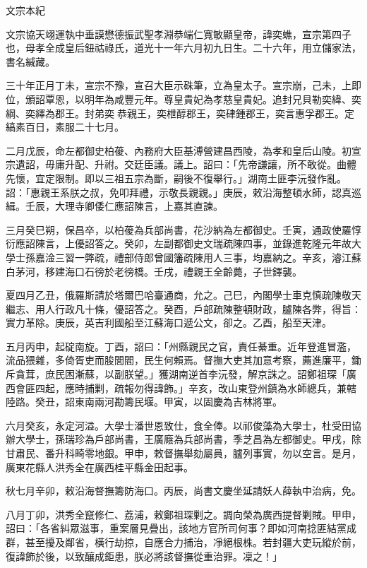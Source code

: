 
\begin{pinyinscope}
文宗本紀

文宗協天翊運執中垂謨懋德振武聖孝淵恭端仁寬敏顯皇帝，諱奕蟭，宣宗第四子也，母孝全成皇后鈕祜祿氏，道光十一年六月初九日生。二十六年，用立儲家法，書名緘藏。

三十年正月丁未，宣宗不豫，宣召大臣示硃筆，立為皇太子。宣宗崩，己未，上即位，頒詔覃恩，以明年為咸豐元年。尊皇貴妃為孝慈皇貴妃。追封兄貝勒奕緯、奕綱、奕繹為郡王。封弟奕恭親王，奕枻醇郡王，奕硉鍾郡王，奕言惠孚郡王。定縞素百日，素服二十七月。

二月戊辰，命左都御史柏葰、內務府大臣基溥營建昌西陵，為孝和皇后山陵。初宣宗遺詔，毋庸升配、升祔。交廷臣議。議上。詔曰：「先帝謙讓，所不敢從。曲體先懷，宜定限制。即以三祖五宗為斷，嗣後不復舉行。」湖南土匪李沅發作亂。詔：「惠親王系朕之叔，免叩拜禮，示敬長親親。」庚辰，敕沿海整頓水師，認真巡緝。壬辰，大理寺卿倭仁應詔陳言，上嘉其直諫。

三月癸巳朔，保昌卒，以柏葰為兵部尚書，花沙納為左都御史。壬寅，通政使羅惇衍應詔陳言，上優詔答之。癸卯，左副都御史文瑞疏陳四事，並錄進乾隆元年故大學士孫嘉淦三習一弊疏，禮部侍郎曾國籓疏陳用人三事，均嘉納之。辛亥，濬江蘇白茅河，移建海口石徬於老徬橋。壬戌，禮親王全齡薨，子世鐸襲。

夏四月乙丑，俄羅斯請於塔爾巴哈臺通商，允之。己巳，內閣學士車克慎疏陳敬天繼志、用人行政凡十條，優詔答之。癸酉，戶部疏陳整頓財政，臚陳各弊，得旨：實力革除。庚辰，英吉利國船至江蘇海口遞公文，卻之。乙酉，船至天津。

五月丙申，起碇南旋。丁酉，詔曰：「州縣親民之官，責任綦重。近年登進冒濫，流品猥雜，多倚胥吏而朘閭閻，民生何賴焉。督撫大吏其加意考察，薦進廉平，鋤斥貪茸，庶民困漸蘇，以副朕望。」獲湖南逆首李沅發，解京誅之。詔鄭祖琛「廣西會匪四起，應時捕剿，疏報勿得諱飾。」辛亥，改山東登州鎮為水師總兵，兼轄陸路。癸丑，詔東南兩河勘籌民堰。甲寅，以固慶為吉林將軍。

六月癸亥，永定河溢。大學士潘世恩致仕，食全俸。以祁俊藻為大學士，杜受田協辦大學士，孫瑞珍為戶部尚書，王廣廕為兵部尚書，季芝昌為左都御史。甲戌，除甘肅民、番升科畸零地銀。甲申，敕督撫舉劾屬員，臚列事實，勿以空言。是月，廣東花縣人洪秀全在廣西桂平縣金田起事。

秋七月辛卯，敕沿海督撫籌防海口。丙辰，尚書文慶坐延請妖人薛執中治病，免。

八月丁卯，洪秀全竄修仁、荔浦，敕鄭祖琛剿之。調向榮為廣西提督剿賊。甲申，詔曰：「各省糾眾滋事，重案層見疊出，該地方官所司何事？即如河南捻匪結黨成群，甚至擾及鄰省，橫行劫掠，自應合力捕治，凈絕根株。若封疆大吏玩縱於前，復諱飾於後，以致釀成鉅患，朕必將該督撫從重治罪。凜之！」


\end{pinyinscope}
